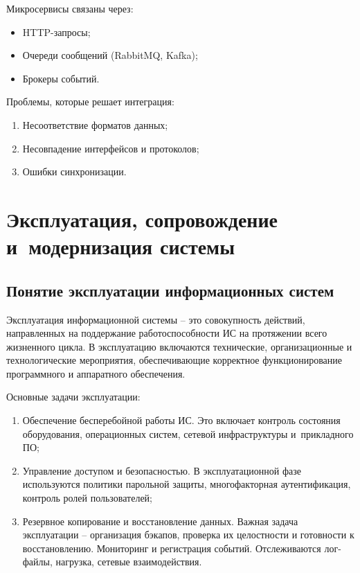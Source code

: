 \documentclass{ou}
\begin{document}
Микросервисы связаны через:
\begin{itemize}[label=-, leftmargin=0em, itemindent=3.35em, nosep]
\item HTTP-запросы;
\item Очереди сообщений (RabbitMQ, Kafka);
\item Брокеры событий.
\end{itemize}

Проблемы, которые решает интеграция:
\begin{enumerate}[leftmargin=0em, itemindent=3.75em, nosep, label=\arabic*)]
\item Несоответствие форматов данных;
\item Несовпадение интерфейсов и протоколов;
\item Ошибки синхронизации.
\end{enumerate}
\newpage
\section{Эксплуатация, сопровождение и~модернизация системы}
\subsection{Понятие эксплуатации информационных систем}
Эксплуатация информационной системы -- это совокупность действий, направленных на поддержание работоспособности ИС на протяжении всего жизненного цикла. В эксплуатацию включаются технические, организационные и технологические мероприятия, обеспечивающие корректное функционирование программного и аппаратного обеспечения.

Основные задачи эксплуатации:
\begin{enumerate}[leftmargin=0em, itemindent=3.75em, nosep, label=\arabic*)]
\item Обеспечение бесперебойной работы ИС. Это включает контроль состояния оборудования, операционных систем, сетевой инфраструктуры и~прикладного ПО;
\item Управление доступом и безопасностью. В эксплуатационной фазе используются политики парольной защиты, многофакторная аутентификация, контроль ролей пользователей;
\item Резервное копирование и восстановление данных. Важная задача эксплуатации -- организация бэкапов, проверка их целостности и готовности к восстановлению. Мониторинг и регистрация событий. Отслеживаются лог-файлы, нагрузка, сетевые взаимодействия.
\end{enumerate}
\end{document}
